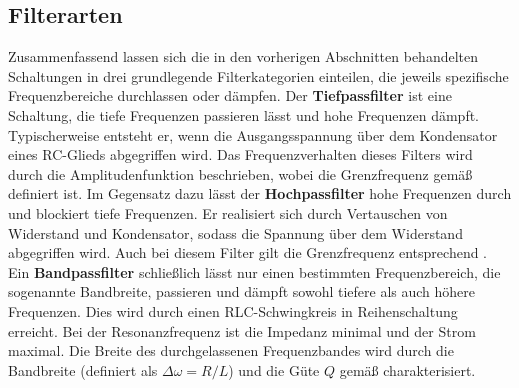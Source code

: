 \subsection{Filterarten}
\label{sec:FilterUebersicht}
Zusammenfassend lassen sich die in den vorherigen Abschnitten behandelten Schaltungen in drei grundlegende Filterkategorien einteilen, die jeweils spezifische Frequenzbereiche durchlassen oder dämpfen.
Der \textbf{Tiefpassfilter} ist eine Schaltung, die tiefe Frequenzen passieren lässt und hohe Frequenzen dämpft. Typischerweise entsteht er, wenn die Ausgangsspannung über dem Kondensator eines RC-Glieds abgegriffen wird. Das Frequenzverhalten dieses Filters wird durch die Amplitudenfunktion  beschrieben, wobei die Grenzfrequenz gemäß  definiert ist.
Im Gegensatz dazu lässt der \textbf{Hochpassfilter} hohe Frequenzen durch und blockiert tiefe Frequenzen. Er realisiert sich durch Vertauschen von Widerstand und Kondensator, sodass die Spannung über dem Widerstand abgegriffen wird. Auch bei diesem Filter gilt die Grenzfrequenz entsprechend .
Ein \textbf{Bandpassfilter} schließlich lässt nur einen bestimmten Frequenzbereich, die sogenannte Bandbreite, passieren und dämpft sowohl tiefere als auch höhere Frequenzen. Dies wird durch einen RLC-Schwingkreis in Reihenschaltung erreicht. Bei der Resonanzfrequenz  ist die Impedanz minimal und der Strom maximal. Die Breite des durchgelassenen Frequenzbandes wird durch die Bandbreite (definiert als $\Delta \omega = R/L$) und die Güte $Q$ gemäß  charakterisiert.